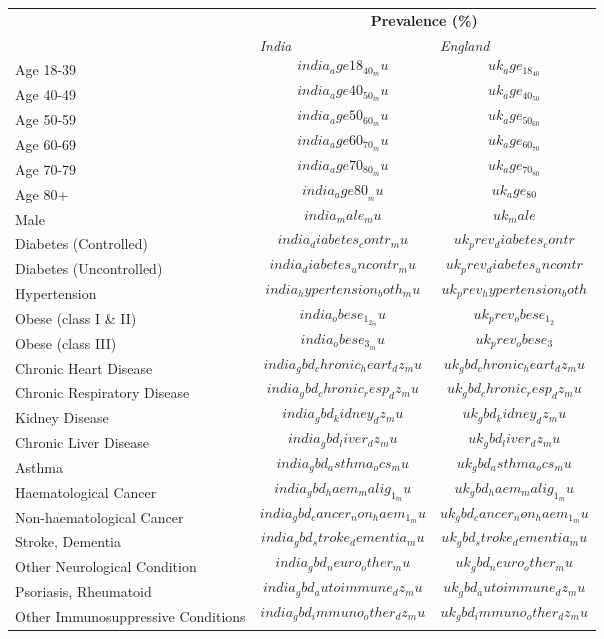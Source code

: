 
\begin{tabular}{p{6cm}p{1.1cm}p{1cm}}
& \multicolumn{2}{c}{\textbf{Prevalence (\%)  }} \\[0.5ex] & \emph{India} & \emph{England} \\[2ex]
Age 18-39 & $$india_age18_40_mu$$ & $$uk_age_18_40$$ \\[0.25ex]
Age 40-49 & $$india_age40_50_mu$$ & $$uk_age_40_50$$ \\[0.25ex]
Age 50-59 & $$india_age50_60_mu$$ & $$uk_age_50_60$$\\[0.25ex]
Age 60-69 & $$india_age60_70_mu$$ & $$uk_age_60_70$$\\[0.25ex]
Age 70-79 & $$india_age70_80_mu$$ & $$uk_age_70_80$$\\[0.25ex]
Age 80+ & $$india_age80__mu$$ & $$uk_age_80$$ \\[0.25ex]
Male & $$india_male_mu$$ & $$uk_male$$ \\[0.25ex]
Diabetes (Controlled) & $$india_diabetes_contr_mu$$ & $$uk_prev_diabetes_contr$$ \\[0.25ex]
Diabetes (Uncontrolled) & $$india_diabetes_uncontr_mu$$ & $$uk_prev_diabetes_uncontr$$ \\[0.25ex]
Hypertension & $$india_hypertension_both_mu$$ & $$uk_prev_hypertension_both$$ \\[0.25ex]
Obese (class I \& II) & $$india_obese_1_2_mu$$ & $$uk_prev_obese_1_2$$ \\[0.25ex]
Obese (class III) & $$india_obese_3_mu$$ & $$uk_prev_obese_3$$ \\[0.25ex]
Chronic Heart Disease & $$india_gbd_chronic_heart_dz_mu$$ & $$uk_gbd_chronic_heart_dz_mu$$ \\[0.25ex]
Chronic Respiratory Disease & $$india_gbd_chronic_resp_dz_mu$$ & $$uk_gbd_chronic_resp_dz_mu$$ \\[0.25ex]
Kidney Disease & $$india_gbd_kidney_dz_mu$$ & $$uk_gbd_kidney_dz_mu$$ \\[0.25ex]
Chronic Liver Disease & $$india_gbd_liver_dz_mu$$ & $$uk_gbd_liver_dz_mu$$ \\[0.25ex]
Asthma & $$india_gbd_asthma_ocs_mu$$ & $$uk_gbd_asthma_ocs_mu$$ \\[0.25ex]
Haematological Cancer & $$india_gbd_haem_malig_1_mu$$ & $$uk_gbd_haem_malig_1_mu$$\\[0.25ex]
Non-haematological Cancer & $$india_gbd_cancer_non_haem_1_mu$$ & $$uk_gbd_cancer_non_haem_1_mu$$ \\[0.25ex]
Stroke, Dementia & $$india_gbd_stroke_dementia_mu$$ & $$uk_gbd_stroke_dementia_mu$$ \\[0.25ex]
Other Neurological Condition & $$india_gbd_neuro_other_mu$$ & $$uk_gbd_neuro_other_mu$$ \\[0.25ex]
Psoriasis, Rheumatoid & $$india_gbd_autoimmune_dz_mu$$ & $$uk_gbd_autoimmune_dz_mu$$ \\[0.25ex]
Other Immunosuppressive Conditions & $$india_gbd_immuno_other_dz_mu$$ & $$uk_gbd_immuno_other_dz_mu$$ \\[0.25ex]
\end{tabular}
